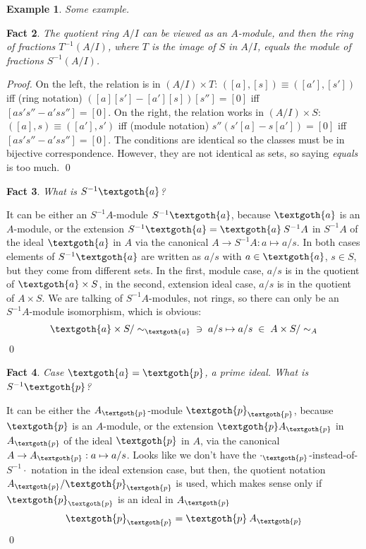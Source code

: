 \documentclass{article}
\newtheorem{theorem}{Fact}[section]
\newtheorem{example}[theorem]{Example}
\begin{document}
\begin{example}
Some example.
\end{example}

\begin{theorem}
The quotient ring $A/I$ can be viewed as an $A$-module, and then the ring of fractions $T^{-1}(A/I)$, where $T$ is the image of $S$ in $A/I$, equals the module of fractions $S^{-1}(A/I)$.
\end{theorem} 

\noindent
\textit{Proof.} On the left, the relation is in $ (A/I) \times T $: $ ([a], [s]) \equiv ([a'], [s']) $ iff (ring notation) $([a][s'] - [a'][s]) [s''] = [0]$ iff $[as's'' - a'ss''] = [0]$. On the right, the relation works in $ (A/I) \times S $: $ ([a], s) \equiv ([a'], s') $ iff (module notation) $s'' (s'[a] - s[a']) = [0]$ iff $[as's'' - a'ss''] = [0]$. The conditions are identical so the classes must be in bijective correspondence. However, they are not identical as sets, so saying \textit{equals} is too much.
\qed

\begin{theorem}
What is $S^{-1}\textgoth{a}$?
\end{theorem}

\noindent
It can be either an $S^{-1}A$-module $S^{-1}\textgoth{a}$, because $\textgoth{a}$ is an $A$-module, or the extension $S^{-1}\textgoth{a} = \textgoth{a} \: S^{-1}A$ in $S^{-1}A$ of the ideal $\textgoth{a}$ in $A$ via the canonical $A \rightarrow S^{-1}A: a \mapsto a/s$. In both cases elements of $S^{-1}\textgoth{a}$ are written as $a/s$ with $a \in \textgoth{a}$, $s \in S$, but they come from different sets. In the first, module case, $a/s$ is in the quotient of $\textgoth{a} \times S$, in the second, extension ideal case, $a/s$ is in the quotient of $A \times S$. We are talking of $S^{-1}A$-modules, not rings, so there can only be an $S^{-1}A$-module isomorphism, which is obvious:
\[
  \textgoth{a} \times S / \sim_\textgoth{a} \; \; \ni \; a/s \mapsto a/s \; \in \; A \times S / \sim_A
\]
\qed

\begin{theorem}
Case $\textgoth{a} = \textgoth{p}$, a prime ideal. What is $S^{-1}\textgoth{p}$?
\end{theorem}

\noindent
It can be either the $A_\textgoth{p}$-module $\textgoth{p}_\textgoth{p}$, because $\textgoth{p}$ is an $A$-module, or the extension $\textgoth{p} A_\textgoth{p}$ in $A_\textgoth{p}$ of the ideal $\textgoth{p}$ in $A$, via the canonical $A \rightarrow A_\textgoth{p} : a \mapsto a/s$. Looks like we don't have the $\cdot_\textgoth{p}$-instead-of-$S^{-1} \cdot$ notation in the ideal extension case, but then, the quotient notation $ A_\textgoth{p} / \textgoth{p}_\textgoth{p}$ is used, which makes sense only if $\textgoth{p}_\textgoth{p}$ is an ideal in $A_\textgoth{p}$
\[
   \textgoth{p}_\textgoth{p} = \textgoth{p} \: A_\textgoth{p}
\]
\qed
\end{document}
